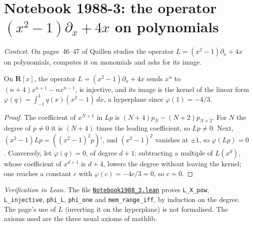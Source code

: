 \section[Notebook 1988-3: the operator $(x^2-1)\partial + 4x$]{Notebook 1988-3: the operator $(x^2 - 1)\partial_x + 4x$ on polynomials\protect{}}\label{sec:quillen-1988-3}

\emph{Context.} On pages~46--47 of  Quillen studies the operator $L = (x^2 - 1)\partial_x + 4x$ on polynomials, computes it on monomials and asks for its image.

\begin{encadre}
\begin{theoreme}\label{thm:quillen-1988-3}
On $\mathbf R[x]$, the operator $L = (x^2 - 1)\partial_x + 4x$ sends $x^n$ to $(n + 4)x^{n+1} - nx^{n-1}$, is injective, and its image is the kernel of the linear form $\varphi(q) = \int_{-1}^1 q(x)(x^2 - 1)\,dx$, a hyperplane since $\varphi(1) = -4/3$.
\end{theoreme}
\end{encadre}

\begin{proof}
The coefficient of $x^{N+1}$ in $Lp$ is $(N + 4)p_N - (N + 2)p_{N+2}$. For $N$ the degree of $p \ne 0$ it is $(N + 4)$ times the leading coefficient, so $Lp \ne 0$. Next, $(x^2 - 1)Lp = ((x^2 - 1)^2p)'$, and $(x^2 - 1)^2$ vanishes at $\pm1$, so $\varphi(Lp) = 0$. Conversely, let $\varphi(q) = 0$, of degree $d + 1$: subtracting a multiple of $L(x^d)$, whose coefficient of $x^{d+1}$ is $d + 4$, lowers the degree without leaving the kernel; one reaches a constant $c$ with $\varphi(c) = -4c/3 = 0$, so $c = 0$.
\end{proof}

\emph{Verification in Lean.} The file \href{\leanblobmain/Notebook1988_3.lean}{\texttt{Notebook1988\_3.\allowbreak{}lean}} proves \texttt{L\_X\_pow}, \texttt{L\_injective}, \texttt{phi\_L}, \texttt{phi\_one} and \texttt{mem\_range\_iff}, by induction on the degree. The page's use of $L$ (inverting it on the hyperplane) is not formalised. The axioms used are the three usual axioms of mathlib.

